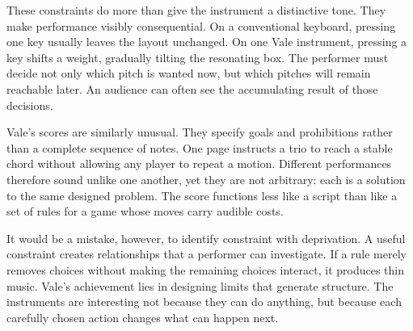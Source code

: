 These constraints do more than give the instrument a distinctive tone. They make
performance visibly consequential. On a conventional keyboard, pressing one key
usually leaves the layout unchanged. On one Vale instrument, pressing a key
shifts a weight, gradually tilting the resonating box. The performer must decide
not only which pitch is wanted now, but which pitches will remain reachable later.
An audience can often see the accumulating result of those decisions.

Vale's scores are similarly unusual. They specify goals and prohibitions rather
than a complete sequence of notes. One page instructs a trio to reach a stable
chord without allowing any player to repeat a motion. Different performances
therefore sound unlike one another, yet they are not arbitrary: each is a solution
to the same designed problem. The score functions less like a script than like a
set of rules for a game whose moves carry audible costs.

It would be a mistake, however, to identify constraint with deprivation. A useful
constraint creates relationships that a performer can investigate. If a rule
merely removes choices without making the remaining choices interact, it produces
thin music. Vale's achievement lies in designing limits that generate structure.
The instruments are interesting not because they can do anything, but because
each carefully chosen action changes what can happen next.

